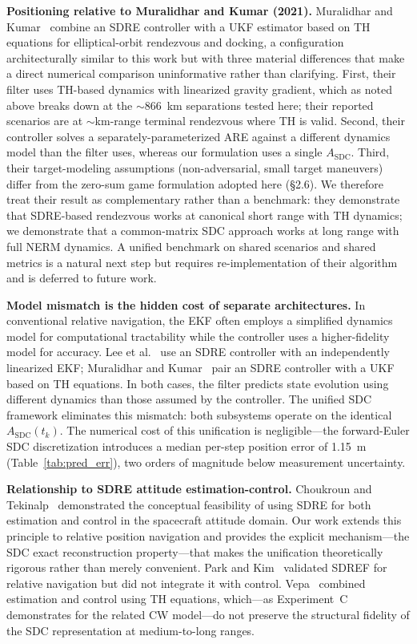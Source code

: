 \documentclass[preprint,3p,times]{elsarticle}
\begin{document}
\textbf{Positioning relative to Muralidhar and Kumar (2021).} Muralidhar and Kumar~\cite{Muralidhar2021} combine an SDRE controller with a UKF estimator based on TH equations for elliptical-orbit rendezvous and docking, a configuration architecturally similar to this work but with three material differences that make a direct numerical comparison uninformative rather than clarifying. First, their filter uses TH-based dynamics with linearized gravity gradient, which as noted above breaks down at the ${\sim}$866~km separations tested here; their reported scenarios are at ${\sim}$km-range terminal rendezvous where TH is valid. Second, their controller solves a separately-parameterized ARE against a different dynamics model than the filter uses, whereas our formulation uses a single $A_{\text{SDC}}$. Third, their target-modeling assumptions (non-adversarial, small target maneuvers) differ from the zero-sum game formulation adopted here (§2.6). We therefore treat their result as complementary rather than a benchmark: they demonstrate that SDRE-based rendezvous works at canonical short range with TH dynamics; we demonstrate that a common-matrix SDC approach works at long range with full NERM dynamics. A unified benchmark on shared scenarios and shared metrics is a natural next step but requires re-implementation of their algorithm and is deferred to future work.

\textbf{Model mismatch is the hidden cost of separate architectures.} In conventional relative navigation, the EKF often employs a simplified dynamics model for computational tractability while the controller uses a higher-fidelity model for accuracy. Lee et al.~\cite{Lee2012} use an SDRE controller with an independently linearized EKF; Muralidhar and Kumar~\cite{Muralidhar2021} pair an SDRE controller with a UKF based on TH equations. In both cases, the filter predicts state evolution using different dynamics than those assumed by the controller. The unified SDC framework eliminates this mismatch: both subsystems operate on the identical $A_{\text{SDC}}(t_k)$. The numerical cost of this unification is negligible---the forward-Euler SDC discretization introduces a median per-step position error of 1.15~m (Table~\ref{tab:pred_err}), two orders of magnitude below measurement uncertainty.

\textbf{Relationship to SDRE attitude estimation-control.} Choukroun and Tekinalp~\cite{Choukroun2013} demonstrated the conceptual feasibility of using SDRE for both estimation and control in the spacecraft attitude domain. Our work extends this principle to relative position navigation and provides the explicit mechanism---the SDC exact reconstruction property---that makes the unification theoretically rigorous rather than merely convenient. Park and Kim~\cite{Park2016} validated SDREF for relative navigation but did not integrate it with control. Vepa~\cite{Vepa2018} combined estimation and control using TH equations, which---as Experiment~C demonstrates for the related CW model---do not preserve the structural fidelity of the SDC representation at medium-to-long ranges.
\end{document}
